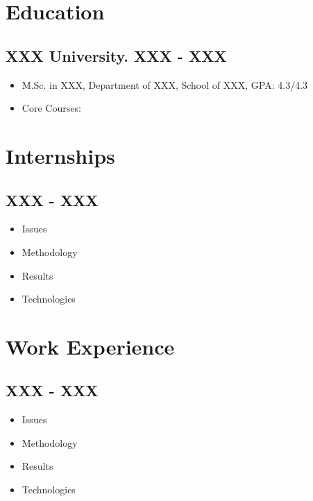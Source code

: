 \documentclass[a4paper,10pt]{article}
\begin{document}
\subsection*{}
\label{english-version}

\section*{Education}
 
\subsection*{XXX University. \hfill XXX - XXX}
\begin{itemize}
    \item M.Sc. in XXX, Department of XXX, School of XXX, GPA: 4.3/4.3
    \item Core Courses:
\end{itemize}

\section*{Internships}
\subsection*{ \hfill XXX - XXX}
\begin{itemize}
    \item Issues
    \item Methodology
    \item Results
    \item Technologies
\end{itemize}

\section*{Work Experience}
\subsection*{ \hfill XXX - XXX}
\begin{itemize}
    \item Issues
    \item Methodology
    \item Results
    \item Technologies
\end{itemize}
\end{document}
